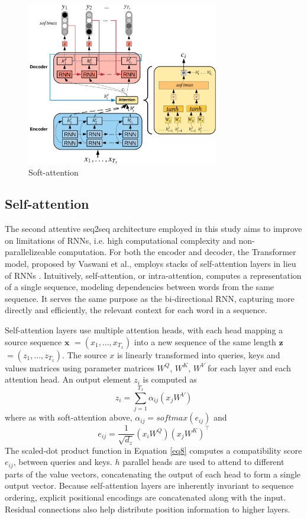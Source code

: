 \documentclass[a4paper]{article}
\begin{document}
\begin{figure}[h]
  \centering
  \includegraphics[width=3.3in]{soft-attention_io.pdf}
  \caption{Soft-attention}
  \label{fig:Bahdanau_soft_attention}
\end{figure}

\subsection{Self-attention}

The second attentive seq2seq architecture employed in this study aims to improve on limitations of RNNs, i.e. high computational complexity and non-parallelizeable computation. For both the encoder and decoder, the Transformer model, proposed by Vaswani et al., employs stacks of self-attention layers in lieu of RNNs  \cite{vaswani2017attention}. Intuitively, self-attention, or intra-attention, computes a representation of a single sequence, modeling dependencies between words from the same sequence. It serves the same purpose as the bi-directional RNN, capturing more directly and efficiently, the relevant context for each word in a sequence. 

Self-attention layers use multiple attention heads, with each head mapping a source sequence $\mathbf x$ $=(x_1,...,x_{T_x})$ into a new sequence of the same length $\mathbf z$ $=(z_1,...,z_{T_x})$. The source $x$ is linearly transformed into queries, keys and values matrices using parameter matrices $W^Q$, $W^K$, $W^V$ for each layer and each attention head. An output element $z_i$ is computed as
\begin{equation}
 	z_{i} = \sum\limits_{j=1}^{T_x} {\alpha}_{{i}{j}}({x_j}W^V)
  \label{eq6}
\end{equation}
where as with soft-attention above, ${\alpha}_{{i}{j}} = softmax(e_{{i}{j}})$ and 
\begin{equation}
 	 e_{ij} = \frac{1}{\sqrt{d_z}}(x_i W^Q)(x_j W^K)^\top
   \label{eq8}
\end{equation}
The scaled-dot product function in Equation \ref{eq8} computes a compatibility score $e_{ij}$, between queries and keys. $h$ parallel heads are used to attend to different parts of the value vectors, concatenating the output of each head to form a single output vector. Because self-attention layers are inherently invariant to sequence ordering, explicit positional encodings are concatenated along with the input. Residual connections also help distribute position information to higher layers.
\end{document}
